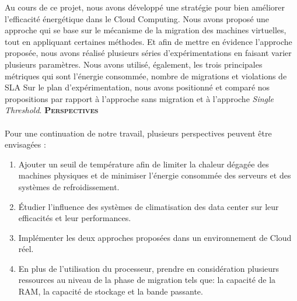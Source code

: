 \begin{onehalfspace}
Au cours de ce projet, nous avons développé une stratégie pour bien améliorer l'efficacité énergétique dans le Cloud Computing. Nous avons proposé une approche qui se base sur le mécanisme de la migration des machines virtuelles, tout en appliquant certaines méthodes. Et afin de mettre en évidence l'approche proposée, nous avons réalisé plusieurs séries d'expérimentations en faisant varier plusieurs paramètres. Nous avons utilisé, également, les trois principales métriques qui sont l'énergie consommée, nombre de migrations et violations de SLA Sur le plan d'expérimentation, nous avons positionné et comparé nos propositions par rapport à l'approche sans migration  et à l'approche \textit{Single Threshold}.
\clearpage
\textbf{\scshape Perspectives}\\\\
Pour une continuation de notre travail, plusieurs perspectives peuvent être envisagées :
\begin{enumerate}
\item Ajouter un seuil de température afin de limiter  la chaleur dégagée des machines physiques et de minimiser l'énergie consommée des serveurs et des systèmes de refroidissement.
\item Étudier l'influence des systèmes de climatisation des data center sur leur efficacités et leur performances.
\item Implémenter les deux approches proposées dans un environnement de Cloud réel.
\item En plus de l'utilisation du processeur,  prendre en considération   plusieurs ressources au niveau de la phase de migration tels que: la capacité de la RAM, la capacité de stockage et la bande passante. 
\end{enumerate}

\end{onehalfspace}
